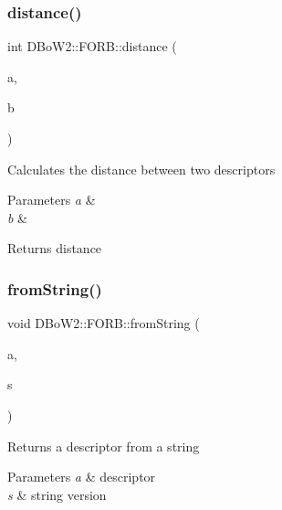 \subsubsection{\texorpdfstring{distance()}{distance()}}
{\footnotesize\ttfamily int D\+Bo\+W2\+::\+F\+O\+R\+B\+::distance (\begin{DoxyParamCaption}\item[{const \mbox{\hyperlink{class_d_bo_w2_1_1_f_o_r_b_aef9b966d0293836fab9f55f1799ce0ed}{T\+Descriptor}} \&}]{a,  }\item[{const \mbox{\hyperlink{class_d_bo_w2_1_1_f_o_r_b_aef9b966d0293836fab9f55f1799ce0ed}{T\+Descriptor}} \&}]{b }\end{DoxyParamCaption})\hspace{0.3cm}{\ttfamily [static]}}

Calculates the distance between two descriptors 
\begin{DoxyParams}{Parameters}
{\em a} & \\
\hline
{\em b} & \\
\hline
\end{DoxyParams}
\begin{DoxyReturn}{Returns}
distance 
\end{DoxyReturn}
\mbox{\label{class_d_bo_w2_1_1_f_o_r_b_a4023e7775d0691b44f6708f865b6b8d7}} 
\subsubsection{\texorpdfstring{from\+String()}{fromString()}}
{\footnotesize\ttfamily void D\+Bo\+W2\+::\+F\+O\+R\+B\+::from\+String (\begin{DoxyParamCaption}\item[{\mbox{\hyperlink{class_d_bo_w2_1_1_f_o_r_b_aef9b966d0293836fab9f55f1799ce0ed}{F\+O\+R\+B\+::\+T\+Descriptor}} \&}]{a,  }\item[{const std\+::string \&}]{s }\end{DoxyParamCaption})\hspace{0.3cm}{\ttfamily [static]}}

Returns a descriptor from a string 
\begin{DoxyParams}{Parameters}
{\em a} & descriptor \\
\hline
{\em s} & string version \\
\hline
\end{DoxyParams}
\mbox{\label{class_d_bo_w2_1_1_f_o_r_b_a9d78adf3c5c6fe8f2e8668e247acf5cc}} 
